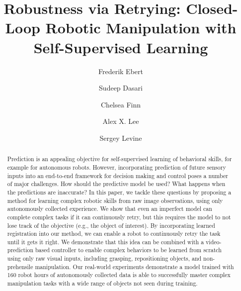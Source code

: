 \documentclass{article}
\title{Robustness via Retrying: Closed-Loop Robotic Manipulation with Self-Supervised Learning}
\author[1]{Frederik Ebert}
\author[1]{Sudeep Dasari}
\author[1]{Chelsea Finn}
\author[1]{Alex X. Lee}
\author[1]{Sergey Levine}
\affil[1]{\footnotesize Department of Electrical Engineering and Computer Sciences, UC Berkeley, United States}
\affil[ ]{\texttt{\{febert, sdasari, cbfinn,alexlee\_gk,svlevine\}@berkeley.edu}}
\begin{document}

\maketitle

\begin{abstract}
Prediction is an appealing objective for self-supervised learning of behavioral skills, for example for autonomous robots. However, incorporating prediction of future sensory inputs into an end-to-end framework for decision making and control poses a number of major challenges. How should the predictive model be used? What happens when the predictions are inaccurate? In this paper, we tackle these questions by proposing a method for learning complex robotic skills from raw image observations, using only autonomously collected experience. We show that even an imperfect model can complete complex tasks if it can continuously retry, but this requires the model to not lose track of the objective (e.g., the object of interest). By incorporating  learned registration into our method, we can enable a robot to continuously retry the task until it gets it right. We demonstrate that this idea can be combined with a video-prediction based controller to enable complex behaviors to be learned from scratch using only raw visual inputs, including grasping, repositioning objects, and non-prehensile manipulation. Our real-world experiments demonstrate a model trained with 160 robot hours of autonomously collected data is able to successfully master complex manipulation tasks with a wide range of objects not seen during training. 

\end{abstract}
\end{document}
